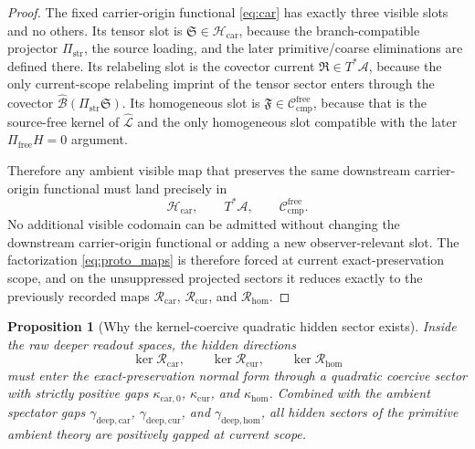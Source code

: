 \documentclass[11pt]{article}
\newcommand{\Sub}{\mathcal A}
\newcommand{\SubGaugeVec}{\widehat{\mathcal B}}
\newcommand{\SubReducedEin}{\widehat{\mathcal L}}
\newcommand{\CompFree}{\mathscr C_{\mathrm{cmp}}^{\mathrm{free}}}
\newcommand{\CarrierClass}{\mathscr H_{\mathrm{car}}}
\newcommand{\CarrierProj}{\Pi_{\mathrm{str}}}
\newcommand{\CarrierSeed}{\mathfrak S}
\newcommand{\RelabelSeed}{\mathfrak R}
\newcommand{\FreeSeed}{\mathfrak F}
\newcommand{\PreCarGap}{\kappa_{\mathrm{car},0}}
\newcommand{\CurrentGap}{\kappa_{\mathrm{cur}}}
\newcommand{\HomGap}{\kappa_{\mathrm{hom}}}
\newcommand{\CarRead}{\mathcal R_{\mathrm{car}}}
\newcommand{\CurRead}{\mathcal R_{\mathrm{cur}}}
\newcommand{\HomRead}{\mathcal R_{\mathrm{hom}}}
\newcommand{\ProtoCarGap}{\gamma_{\mathrm{deep,car}}}
\newcommand{\ProtoCurGap}{\gamma_{\mathrm{deep,cur}}}
\newcommand{\ProtoHomGap}{\gamma_{\mathrm{deep,hom}}}
\newtheorem{proposition}{Proposition}
\begin{document}
\begin{proof}
The fixed carrier-origin functional \eqref{eq:car} has exactly three visible slots and no others. Its tensor slot is \(\CarrierSeed\in\CarrierClass\), because the branch-compatible projector \(\CarrierProj\), the source loading, and the later primitive/coarse eliminations are defined there. Its relabeling slot is the covector current \(\RelabelSeed\in T^*\Sub\), because the only current-scope relabeling imprint of the tensor sector enters through the covector \(\SubGaugeVec(\CarrierProj\CarrierSeed)\). Its homogeneous slot is \(\FreeSeed\in\CompFree\), because that is the source-free kernel of \(\SubReducedEin\) and the only homogeneous slot compatible with the later \(\Pi_{\mathrm{free}}H=0\) argument.

Therefore any ambient visible map that preserves the same downstream carrier-origin functional must land precisely in
\[
\CarrierClass,\qquad
T^*\Sub,\qquad
\CompFree.
\]
No additional visible codomain can be admitted without changing the downstream carrier-origin functional or adding a new observer-relevant slot. The factorization \eqref{eq:proto_maps} is therefore forced at current exact-preservation scope, and on the unsuppressed projected sectors it reduces exactly to the previously recorded maps \(\CarRead\), \(\CurRead\), and \(\HomRead\).
\end{proof}

\begin{proposition}[Why the kernel-coercive quadratic hidden sector exists]
\label{prop:kernelquadratic}
Inside the raw deeper readout spaces, the hidden directions
\[
\ker\CarRead,\qquad
\ker\CurRead,\qquad
\ker\HomRead
\]
must enter the exact-preservation normal form through a quadratic coercive sector with strictly positive gaps \(\PreCarGap\), \(\CurrentGap\), and \(\HomGap\). Combined with the ambient spectator gaps \(\ProtoCarGap\), \(\ProtoCurGap\), and \(\ProtoHomGap\), all hidden sectors of the primitive ambient theory are positively gapped at current scope.
\end{proposition}
\end{document}
